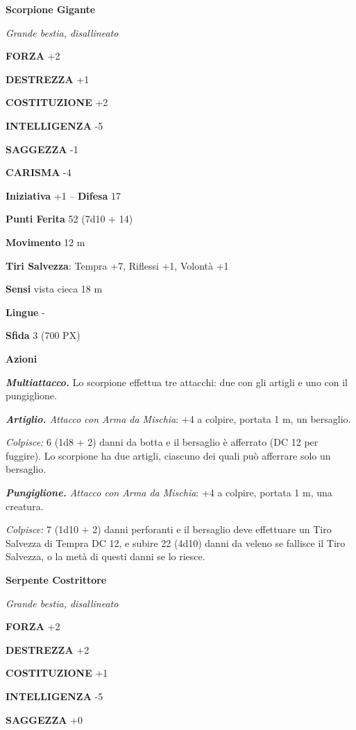 \begin{multicols}{2}
	\medskip\textbf{Scorpione Gigante}

	\textit{Grande bestia, disallineato}

	\textbf{FORZA} +2

	\textbf{DESTREZZA} +1

	\textbf{COSTITUZIONE} +2

	\textbf{INTELLIGENZA} -5

	\textbf{SAGGEZZA} -1

	\textbf{CARISMA} -4

	\textbf{Iniziativa} +1 -- \textbf{Difesa} 17

	\textbf{Punti Ferita} 52 (7d10 + 14)

	\textbf{Movimento} 12 m

	\textbf{Tiri Salvezza}: Tempra +7, Riflessi +1, Volontà +1

	\textbf{Sensi} vista cieca 18 m

	\textbf{Lingue} -

	\textbf{Sfida} 3 (700 PX)

	\textbf{Azioni}

	\textit{\textbf{Multiattacco.}} Lo scorpione effettua tre attacchi: due con gli artigli e uno con il pungiglione.

	\textit{\textbf{Artiglio.} Attacco con Arma da Mischia}: +4 a colpire, portata 1 m, un bersaglio.

	\textit{Colpisce:} 6 (1d8 + 2) danni da botta e il bersaglio è afferrato (DC 12 per fuggire). Lo scorpione ha due artigli, ciascuno dei quali può afferrare solo un bersaglio.

	\textit{\textbf{Pungiglione.} Attacco con Arma da Mischia}: +4 a colpire, portata 1 m, una creatura.

	\textit{Colpisce:} 7 (1d10 + 2) danni perforanti e il bersaglio deve effettuare un Tiro Salvezza di Tempra DC 12, e subire 22 (4d10) danni da veleno se fallisce il Tiro Salvezza, o la metà di questi danni se lo riesce.

	\medskip\textbf{Serpente Costrittore}

	\textit{Grande bestia, disallineato}

	\textbf{FORZA} +2

	\textbf{DESTREZZA} +2

	\textbf{COSTITUZIONE} +1

	\textbf{INTELLIGENZA} -5

	\textbf{SAGGEZZA} +0


\end{multicols}
